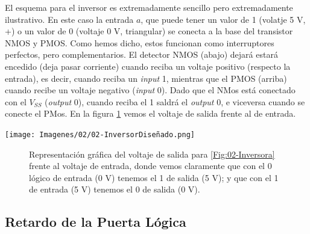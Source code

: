 \begin{minipage}{0.65\linewidth}
El esquema para el inversor es extremadamente sencillo pero extremadamente ilustrativo. En este caso la entrada $a$, que puede tener un valor de 1 (volatje 5 V, +) o un valor de 0 (voltaje 0 V, triangular) se conecta a la base del transistor NMOS y PMOS. Como hemos dicho, estos funcionan como interruptores perfectos, pero complementarios. El detector NMOS (abajo) dejará estará encedido (deja pasar corriente) cuando reciba un voltaje positivo (respecto la entrada), es decir, cuando reciba un \textit{input} 1, mientras que el PMOS (arriba) cuando recibe un voltaje negativo (\textit{input} 0). Dado que el NMos está conectado con el $V_{SS}$ (\textit{output} 0), cuando reciba el 1 saldrá el \textit{output} 0, e viceversa cuando se conecte el PMos. En la figura \cref{Fig:02-InversorV} vemos el voltaje de salida frente al de entrada.
\end{minipage}
\hfill
\begin{minipage}{0.32\linewidth} \centering
    \texttt{[image: Imagenes/02/02-InversorDiseñado.png]}
    \label{Fig:02-Inversora}
\end{minipage}


\begin{figure}[H] \centering
{}
\caption{Representación gráfica del voltaje de salida para \cref{Fig:02-Inversora} frente al voltaje de entrada, donde vemos claramente que con el 0 lógico de entrada (0 V) tenemos el 1 de salida (5 V); y que con el 1 de entrada (5 V) tenemos el 0 de salida (0 V).}
\label{Fig:02-InversorV}
\end{figure}



\subsection{Retardo de la Puerta Lógica}

